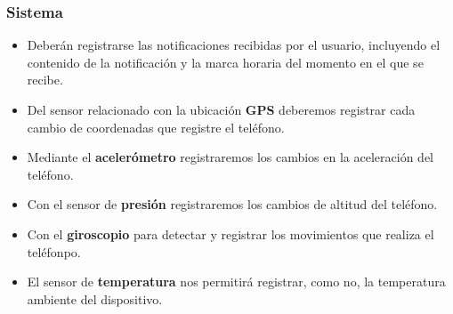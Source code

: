 \documentclass[12pt,a4paper,oneside]{book} %
\begin{document}
\subsubsection{Sistema}
\begin{itemize}
  \item Deberán registrarse las notificaciones recibidas por el usuario, incluyendo el contenido de la notificación y la marca horaria del momento en el que se recibe.
  \item Del sensor relacionado con la ubicación \textbf{GPS} deberemos registrar cada cambio de coordenadas que registre el teléfono. 
  \item Mediante el \textbf{acelerómetro} registraremos los cambios en la aceleración del teléfono. 
  \item Con el sensor de \textbf{presión} registraremos los cambios de altitud del teléfono. 
  \item Con el \textbf{giroscopio} para detectar y registrar  los movimientos que realiza el teléfonpo. 
  \item El sensor de \textbf{temperatura} nos permitirá registrar, como no, la temperatura ambiente del dispositivo. 
\end{itemize}
\newpage
\end{document}

